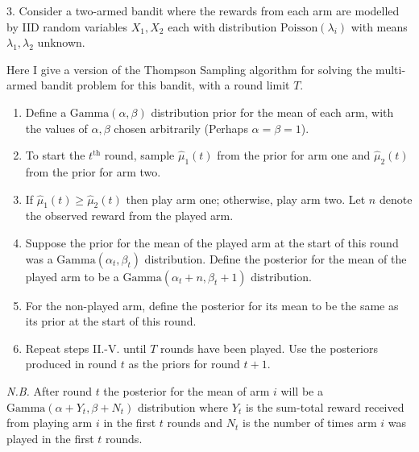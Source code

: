 \documentclass[11pt,a4paper]{article}
\begin{document}
\begin{answer}{3.}
  Consider a two-armed bandit where the rewards from each arm are modelled by IID random variables $X_1,X_2$ each with distribution $\text{Poisson}(\lambda_i)$ with means $\lambda_1,\lambda_2$ unknown.
  \par Here I give a version of the Thompson Sampling algorithm for solving the multi-armed bandit problem for this bandit, with a round limit $T$.
  \renewcommand{\theenumi}{\Roman{enumi}}
  \begin{enumerate}
    \item Define a $\text{Gamma}(\alpha,\beta)$ distribution prior for the mean of each arm, with the values of $\alpha,\beta$ chosen arbitrarily (Perhaps $\alpha=\beta=1$).
    \item To start the $t^\text{th}$ round, sample $\hat\mu_1(t)$ from the prior for arm one and $\hat\mu_2(t)$ from the prior for arm two.
    \item If $\hat\mu_1(t)\geq\hat\mu_2(t)$ then play arm one; otherwise, play arm two. Let $n$ denote the observed reward from the played arm.
    \item Suppose the prior for the mean of the played arm at the start of this round was a $\text{Gamma}(\alpha_t,\beta_t)$ distribution. Define the posterior for the mean of the played arm to be a $\text{Gamma}(\alpha_t+n,\beta_t+1)$ distribution.
    \item For the non-played arm, define the posterior for its mean to be the same as its prior at the start of this round.
    \item Repeat steps II.-V. until $T$ rounds have been played. Use the posteriors produced in round $t$ as the priors for round $t+1$.
  \end{enumerate}
  \textit{N.B.} After round $t$ the posterior for the mean of arm $i$ will be a $\text{Gamma}(\alpha+Y_t,\beta+N_t)$ distribution where $Y_t$ is the sum-total reward received from playing arm $i$ in the first $t$ rounds and $N_t$ is the number of times arm $i$ was played in the first $t$ rounds.
\end{answer}
\end{document}
